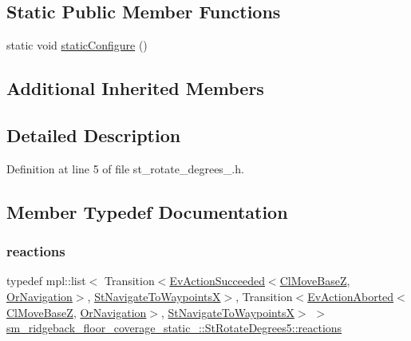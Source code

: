\subsection*{Static Public Member Functions}
\begin{DoxyCompactItemize}
\item 
static void \hyperlink{structsm__ridgeback__floor__coverage__static__1_1_1StRotateDegrees5_ae37fffe9d89ddc649f626cb6bdf034ee}{static\+Configure} ()
\end{DoxyCompactItemize}
\subsection*{Additional Inherited Members}


\subsection{Detailed Description}


Definition at line 5 of file st\+\_\+rotate\+\_\+degrees\+\_.\+h.



\subsection{Member Typedef Documentation}
\mbox{\label{structsm__ridgeback__floor__coverage__static__1_1_1StRotateDegrees5_a0d4965eaff344d4eeba204d5561cb309}} 
\subsubsection{\texorpdfstring{reactions}{reactions}}
{\footnotesize\ttfamily typedef mpl\+::list$<$ Transition$<$\hyperlink{structsmacc_1_1default__events_1_1EvActionSucceeded}{Ev\+Action\+Succeeded}$<$\hyperlink{classcl__move__base__z_1_1ClMoveBaseZ}{Cl\+Move\+BaseZ}, \hyperlink{classsm__ridgeback__floor__coverage__static__1_1_1OrNavigation}{Or\+Navigation}$>$, \hyperlink{structsm__ridgeback__floor__coverage__static__1_1_1StNavigateToWaypointsX}{St\+Navigate\+To\+WaypointsX}$>$, Transition$<$\hyperlink{structsmacc_1_1default__events_1_1EvActionAborted}{Ev\+Action\+Aborted}$<$\hyperlink{classcl__move__base__z_1_1ClMoveBaseZ}{Cl\+Move\+BaseZ}, \hyperlink{classsm__ridgeback__floor__coverage__static__1_1_1OrNavigation}{Or\+Navigation}$>$, \hyperlink{structsm__ridgeback__floor__coverage__static__1_1_1StNavigateToWaypointsX}{St\+Navigate\+To\+WaypointsX}$>$ $>$ \hyperlink{structsm__ridgeback__floor__coverage__static__1_1_1StRotateDegrees5_a0d4965eaff344d4eeba204d5561cb309}{sm\+\_\+ridgeback\+\_\+floor\+\_\+coverage\+\_\+static\+\_\+::\+St\+Rotate\+Degrees5\+::reactions}}




